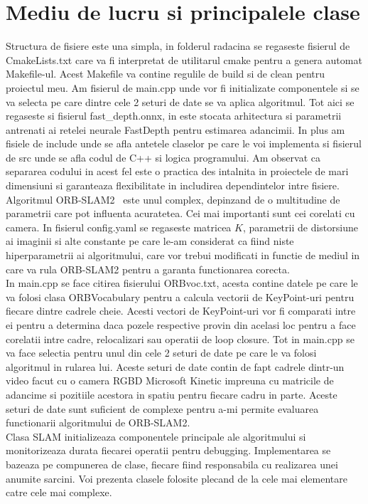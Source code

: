\documentclass[12pt,a4paper]{report}
\begin{document}
\section{Mediu de lucru si principalele clase}
Structura de fisiere este una simpla, in folderul radacina se regaseste fisierul de 
CmakeLists.txt care va fi interpretat de utilitarul cmake pentru a genera automat Makefile-ul. 
Acest Makefile va contine regulile de build si de clean pentru proiectul meu. Am fisierul de 
main.cpp unde vor fi initializate componentele si se va selecta pe care dintre cele 2 seturi
de date se va aplica algoritmul. Tot aici se regaseste si fisierul fast\_depth.onnx, in este 
stocata arhitectura si parametrii antrenati ai retelei neurale FastDepth pentru estimarea 
adancimii. In plus am fisiele de include unde se afla antetele claselor pe care le voi 
implementa si fisierul de src unde se afla codul de C++ si logica programului. Am observat ca 
separarea codului in acest fel este o practica des intalnita in proiectele de mari dimensiuni 
si garanteaza flexibilitate in includirea dependintelor intre fisiere. Algoritmul ORB-SLAM2 \
este unul complex, depinzand de o multitudine de parametrii care pot influenta acuratetea.
Cei mai importanti sunt cei corelati cu camera. In fisierul config.yaml se regaseste matricea \(K\), 
parametrii de distorsiune ai imaginii si alte constante pe care le-am considerat ca fiind niste
hiperparametrii ai algoritmului, care vor trebui modificati in functie de mediul in care va rula
ORB-SLAM2 pentru a garanta functionarea corecta. \\

In main.cpp se face citirea fisierului ORBvoc.txt, acesta contine datele pe care le va folosi
clasa ORBVocabulary pentru a calcula vectorii de KeyPoint-uri pentru fiecare dintre cadrele cheie.
Acesti vectori de KeyPoint-uri vor fi comparati intre ei pentru a determina daca pozele respective 
provin din acelasi loc pentru a face corelatii intre cadre, relocalizari sau operatii de loop
closure. Tot in main.cpp se va face selectia pentru unul din cele 2 seturi de date pe care le va
folosi algoritmul in rularea lui. Aceste seturi de date contin de fapt cadrele dintr-un video 
facut cu o camera RGBD Microsoft Kinetic impreuna cu matricile de adancime si pozitiile acestora
in spatiu pentru fiecare cadru in parte. Aceste seturi de date sunt suficient de complexe pentru 
a-mi permite evaluarea functionarii algoritmului de ORB-SLAM2. \\
Clasa SLAM initializeaza componentele principale ale algoritmului si monitorizeaza durata 
fiecarei operatii pentru debugging. Implementarea se bazeaza pe compunerea de clase, fiecare 
fiind responsabila cu realizarea unei anumite sarcini. Voi prezenta clasele folosite plecand 
de la cele mai elementare catre cele mai complexe. \\
\end{document}
